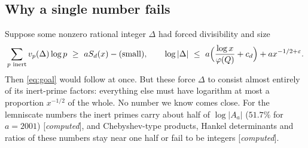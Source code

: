 \documentclass[11pt]{amsart}
\numberwithin{equation}{section}
\theoremstyle{definition}
\theoremstyle{remark}
\newcommand{\status}[1]{\textup{[\emph{#1}]}}
\begin{document}
\subsection*{Why a single number fails}
Suppose some nonzero rational integer $\Delta$ had forced divisibility and size
\begin{equation}
 \sum_{p\text{ inert}}v_p(\Delta)\log p\ \ge\ aS_d(x)-(\text{small}),\qquad \log|\Delta|\ \le\ a\Bigl(\frac{\log x}{\varphi(Q)}+c_d\Bigr)+ax^{-1/2+\varepsilon}.
\end{equation}
 Then \eqref{eq:goal} would follow at once. But these force $\Delta$ to consist almost entirely of its inert-prime factors: everything else must have logarithm at most a proportion $x^{-1/2}$ of the whole. No number we know comes close. For the lemniscate numbers the inert primes carry about half of $\log|A_a|$ ($51.7\%$ for $a=2001$) \status{computed}, and Chebyshev-type products, Hankel determinants and ratios of these numbers stay near one half or fail to be integers \status{computed}.
\end{document}
